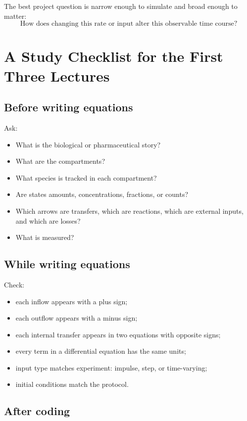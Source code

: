 \documentclass[a4paper]{article}
\begin{document}
The best project question is narrow enough to simulate and broad enough to matter:
\[
  \text{How does changing this rate or input alter this observable time course?}
\]

\section{A Study Checklist for the First Three Lectures}

\subsection{Before writing equations}

Ask:
\begin{itemize}[leftmargin=2em]
  \item What is the biological or pharmaceutical story?
  \item What are the compartments?
  \item What species is tracked in each compartment?
  \item Are states amounts, concentrations, fractions, or counts?
  \item Which arrows are transfers, which are reactions, which are external inputs, and which are losses?
  \item What is measured?
\end{itemize}

\subsection{While writing equations}

Check:
\begin{itemize}[leftmargin=2em]
  \item each inflow appears with a plus sign;
  \item each outflow appears with a minus sign;
  \item each internal transfer appears in two equations with opposite signs;
  \item every term in a differential equation has the same units;
  \item input type matches experiment: impulse, step, or time-varying;
  \item initial conditions match the protocol.
\end{itemize}

\subsection{After coding}
\end{document}
